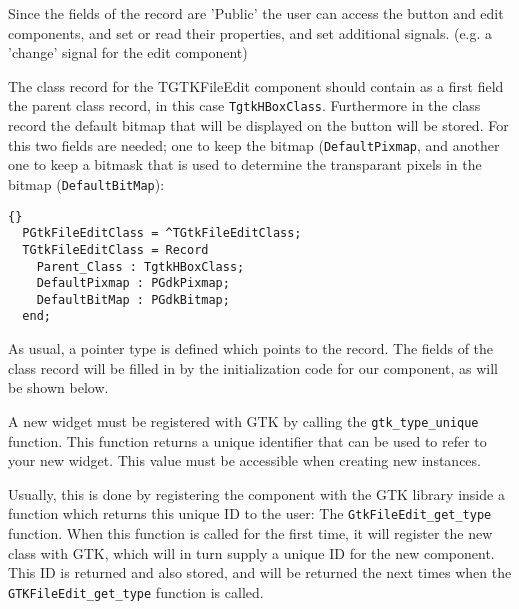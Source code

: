 \documentclass[10pt]{article}
\begin{document}
Since the fields of the record are 'Public' the user can access the button
and edit components, and set or read their properties, and set additional 
signals. (e.g. a 'change' signal for the edit component)

The class record for the {TGTKFileEdit} component should contain as a first 
field the parent class record, in this case \lstinline|TgtkHBoxClass|. Furthermore
in the class record the default bitmap that will be displayed on the button
will be stored. For this two fields are needed; one to keep the bitmap
(\lstinline|DefaultPixmap|, and
another one to keep a bitmask that is used to determine the transparant
pixels in the bitmap (\lstinline|DefaultBitMap|):
\begin{lstlisting}{}
  PGtkFileEditClass = ^TGtkFileEditClass;
  TGtkFileEditClass = Record
    Parent_Class : TgtkHBoxClass;
    DefaultPixmap : PGdkPixmap;
    DefaultBitMap : PGdkBitmap;
  end;
\end{lstlisting}
As usual, a pointer type is defined which points to the record. The fields
of the class record will be filled in by the initialization code for our
component, as will be shown below.

A new widget must be registered with GTK by calling the
\lstinline|gtk_type_unique| function. This function returns a unique
identifier that can be used to refer to your new widget. This value
must be accessible when creating new instances.

Usually, this is done by registering the component with the GTK library
inside a function which returns this unique ID to the user:
The \lstinline|GtkFileEdit_get_type| function. 
When this function is called for the first time, it will register
the new class with GTK, which will in turn supply a unique ID for the
new component. This ID is returned and also stored, and will be returned
the next times when the \lstinline|GTKFileEdit_get_type| function is called.
\end{document}
